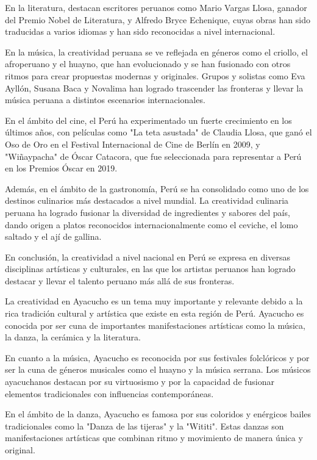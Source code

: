 \documentclass[12pt,a4paper]{article}
\begin{document}
En la literatura, destacan escritores peruanos como Mario Vargas Llosa, ganador del Premio Nobel de Literatura, y Alfredo Bryce Echenique, cuyas obras han sido traducidas a varios idiomas y han sido reconocidas a nivel internacional.

En la música, la creatividad peruana se ve reflejada en géneros como el criollo, el afroperuano y el huayno, que han evolucionado y se han fusionado con otros ritmos para crear propuestas modernas y originales. Grupos y solistas como Eva Ayllón, Susana Baca y Novalima han logrado trascender las fronteras y llevar la música peruana a distintos escenarios internacionales.

En el ámbito del cine, el Perú ha experimentado un fuerte crecimiento en los últimos años, con películas como "La teta asustada" de Claudia Llosa, que ganó el Oso de Oro en el Festival Internacional de Cine de Berlín en 2009, y "Wiñaypacha" de Óscar Catacora, que fue seleccionada para representar a Perú en los Premios Óscar en 2019.

Además, en el ámbito de la gastronomía, Perú se ha consolidado como uno de los destinos culinarios más destacados a nivel mundial. La creatividad culinaria peruana ha logrado fusionar la diversidad de ingredientes y sabores del país, dando origen a platos reconocidos internacionalmente como el ceviche, el lomo saltado y el ají de gallina.

En conclusión, la creatividad a nivel nacional en Perú se expresa en diversas disciplinas artísticas y culturales, en las que los artistas peruanos han logrado destacar y llevar el talento peruano más allá de sus fronteras.

La creatividad en Ayacucho es un tema muy importante y relevante debido a la rica tradición cultural y artística que existe en esta región de Perú. Ayacucho es conocida por ser cuna de importantes manifestaciones artísticas como la música, la danza, la cerámica y la literatura.

En cuanto a la música, Ayacucho es reconocida por sus festivales folclóricos y por ser la cuna de géneros musicales como el huayno y la música serrana. Los músicos ayacuchanos destacan por su virtuosismo y por la capacidad de fusionar elementos tradicionales con influencias contemporáneas.

En el ámbito de la danza, Ayacucho es famosa por sus coloridos y enérgicos bailes tradicionales como la "Danza de las tijeras" y la "Wititi". Estas danzas son manifestaciones artísticas que combinan ritmo y movimiento de manera única y original.
\end{document}
